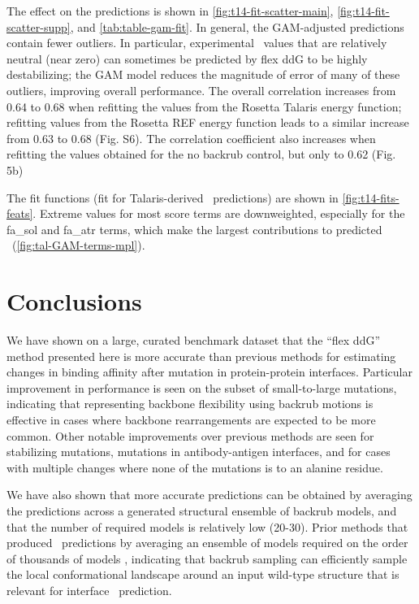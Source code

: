 The effect on the predictions is shown in \cref{fig:t14-fit-scatter-main}, \cref{fig:t14-fit-scatter-supp}, and \cref{tab:table-gam-fit}. In general, the GAM-adjusted predictions contain fewer outliers. In particular, experimental \ddg\ values that are relatively neutral (near zero) can sometimes be predicted by flex ddG to be highly destabilizing; the GAM model reduces the magnitude of error of many of these outliers, improving overall performance. The overall correlation increases from 0.64 to 0.68 when refitting the values from the Rosetta Talaris energy function\cite{song_structure-guided_2011,shapovalov_smoothed_2011,omeara_combined_2015}; refitting values from the Rosetta REF energy function\cite{alford_rosetta_2017} leads to a similar increase from 0.63 to 0.68 (Fig. S6). The correlation coefficient also increases when refitting the values obtained for the no backrub control, but only to 0.62 (Fig. 5b)

The fit functions (fit for Talaris-derived \ddg\ predictions) are shown in \cref{fig:t14-fits-feats}. Extreme values for most score terms are downweighted, especially for the fa\_sol and fa\_atr terms, which make the largest contributions to predicted \ddg\ (\cref{fig:tal-GAM-terms-mpl}).

\section{Conclusions}

We have shown on a large, curated benchmark dataset that the ``flex ddG'' method presented here is more accurate than previous methods for estimating changes in binding affinity after mutation in protein-protein interfaces.
Particular improvement in performance is seen on the subset of small-to-large mutations, indicating that representing backbone flexibility using backrub motions is effective in cases where backbone rearrangements are expected to be more common. Other notable improvements over previous methods are seen for stabilizing mutations, mutations in antibody-antigen interfaces, and for cases with multiple changes where none of the mutations is to an alanine residue.

We have also shown that more accurate predictions can be obtained by averaging the predictions across a generated structural ensemble of backrub models, and that the number of required models is relatively low (20-30).
Prior methods that produced \ddg\ predictions by averaging an ensemble of models required on the order of thousands of models  \cite{benedix_predicting_2009}, indicating that backrub sampling can efficiently sample the local conformational landscape around an input wild-type structure that is relevant for interface \ddg\ prediction.


